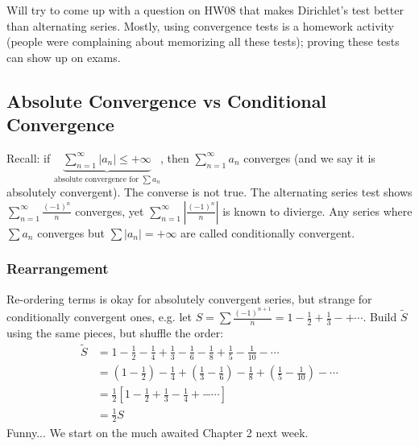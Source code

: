 \documentclass{article}
\theoremstyle{plain}
\theoremstyle{remark}
\begin{document}
Will try to come up with a question on HW08 that makes Dirichlet's
test better than alternating series.
Mostly, using convergence tests is a homework activity
(people were complaining about memorizing all these tests);
proving these tests can show up on exams.

\subsection{Absolute Convergence vs Conditional Convergence}
Recall: if $\underbrace{\sum_{n=1}^\infty |a_n| \leq +\infty}_{
\text{absolute convergence for }\sum a_n}$,
then $\sum_{n=1}^\infty a_n$ converges
(and we say it is absolutely convergent).
The converse is not true.
The alternating series test shows $\sum_{n=1}^\infty \frac{(-1)^n}{n}$ converges,
yet $\sum_{n=1}^\infty \left\lvert\frac{(-1)^n}{n}\right\rvert$
is known to divierge.
Any series where $\sum a_n$ converges but $\sum|a_n| = +\infty$
are called conditionally convergent.

\subsubsection{Rearrangement}
Re-ordering terms is okay for absolutely convergent series,
but strange for conditionally convergent ones, e.g.
let $S = \sum\frac{(-1)^{n+1}}{n} = 1 - \frac{1}{2} + \frac{1}{3} -+ \cdots$.
Build $\tilde{S}$ using the same pieces, but shuffle the order:
\begin{align*}
	\tilde{S}
	&= 1 - \frac{1}{2} - \frac{1}{4} + \frac{1}{3} - \frac{1}{6}
	-\frac{1}{8} + \frac{1}{5}-\frac{1}{10} - \cdots\\
	&= \left(1 - \frac{1}{2}\right) - \frac{1}{4} + \left(\frac{1}{3} - \frac{1}{6}\right)
	-\frac{1}{8} + \left(\frac{1}{5}-\frac{1}{10}\right) - \cdots\\
	&= \frac12\left[1 - \frac{1}{2} + \frac{1}{3} - \frac{1}{4} +- \cdots\right]\\
	&= \frac{1}{2}S
\end{align*}
Funny...
\newline We start on the much awaited Chapter 2 next week.
\end{document}
